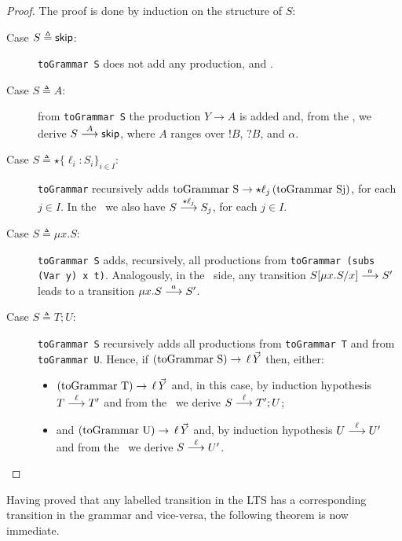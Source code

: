 \begin{proof}
	The proof is done by induction on the structure of $S$:
	\begin{description}
		\item[Case $S \triangleq \skipk$:] \lstinline{toGrammar S} does not 
		     add any production, and .
		\item[Case $S \triangleq A$:] from \lstinline{toGrammar S} the 
		     production $Y\rightarrow A$ is added and, from the \LTS, we derive
		     $S \LTSderives[A] \skipk$, where $A$ ranges over $!B$, $?B$, 
		     and $\alpha$.
		\item[Case $S\triangleq \star \{\ell_i : S_i\}_{i\in I}$:] 
		     \lstinline{toGrammar} recursively adds 
		     $\text{\lstinline{toGrammar S}} \rightarrow \star \ell_j\, 
		     \text{(\lstinline{toGrammar Sj})}$, 
		     for each $j\in I$. In the \LTS\ we also have 
		     $S \LTSderives[\star \ell_j] S_j$, for each $j\in I$.
		\item[Case $S\triangleq \mu x.S$:] \lstinline{toGrammar S} adds, 
		     recursively, all productions from \linebreak \lstinline{toGrammar (subs (Var y) x t)}. 
		     Analogously, in the \LTS\ side, any transition 
		     $S[\mu x.S/x] \LTSderives[a] S'$ leads to a transition 
		     $\mu x.S \LTSderives[a] S'$.
		\item[Case $S \triangleq T;U$:]   \lstinline{toGrammar S} recursively adds 
		     all productions from   \lstinline{toGrammar T} and from  
		     \lstinline{toGrammar U}. Hence, if 
		     $\text{(\lstinline{toGrammar S})} \rightarrow \, \ell \, \vec Y$ then,
		     either: 
		     \begin{itemize}
		     	\item $\text{(\lstinline{toGrammar T}}) \rightarrow \, \ell \, \vec Y$ and,	
		     	      in this case, by induction hypothesis $T \LTSderives[\ell] T'$ and 
		     	      from the \LTS\ we derive $S \LTSderives[\ell] T';U$;
		     	\item {} and $\text{(\lstinline{toGrammar U}}) \rightarrow \, 
		     	      \ell \, \vec Y$ and, by induction hypothesis $U \LTSderives[\ell] U'$
		     	      and from the \LTS\ we derive $S \LTSderives[\ell] U'$.
		     \end{itemize}
	\end{description}
\end{proof}

Having proved that any labelled transition in the LTS has a corresponding
transition in the grammar and vice-versa, the following theorem is now 
immediate.


